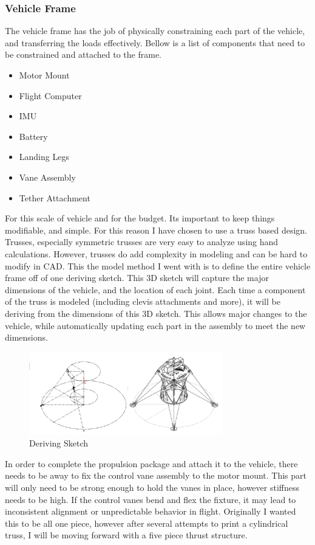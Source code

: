 \documentclass[12pt,letterpaper]{article}
\begin{document}
\subsubsection{Vehicle Frame}

The vehicle frame has the job of physically constraining each part of the vehicle, and transferring the loads effectively. Bellow is a list of components that need to be constrained and attached to the frame.

\begin{itemize}
\item Motor Mount
\item Flight Computer
\item IMU
\item Battery
\item Landing Legs
\item Vane Assembly
\item Tether Attachment
\end{itemize}

For this scale of vehicle and for the budget. Its important to keep things modifiable, and simple. For this reason I have chosen to use a truss based design. Trusses, especially symmetric trusses are very easy to analyze using hand calculations. However, trusses do add complexity in modeling and can be hard to modify in CAD. This the model method I went with is to define the entire vehicle frame off of one deriving sketch. This 3D sketch will capture the major dimensions of the vehicle, and the location of each joint. Each time a component of the truss is modeled (including clevis attachments and more), it will be deriving from the dimensions of this 3D sketch. This allows major changes to the vehicle, while automatically updating each part in the assembly to meet the new dimensions. 

\begin{figure}[h!]
\centering
\includegraphics[width = 0.75\textwidth]{Vehicle_Frame_Fig/Deriving_Sketch.png}
\caption*{Deriving Sketch }
\end{figure}

In order to complete the propulsion package and attach it to the vehicle, there needs to be away to fix the control vane assembly to the motor mount. This part will only need to be strong enough to hold the vanes in place, however stiffness needs to be high. If the control vanes bend and flex the fixture, it may lead to inconsistent alignment or unpredictable behavior in flight. Originally I wanted this to be all one piece, however after several attempts to print a cylindrical truss, I will be moving forward with a five piece thrust structure.\\\\
\end{document}
